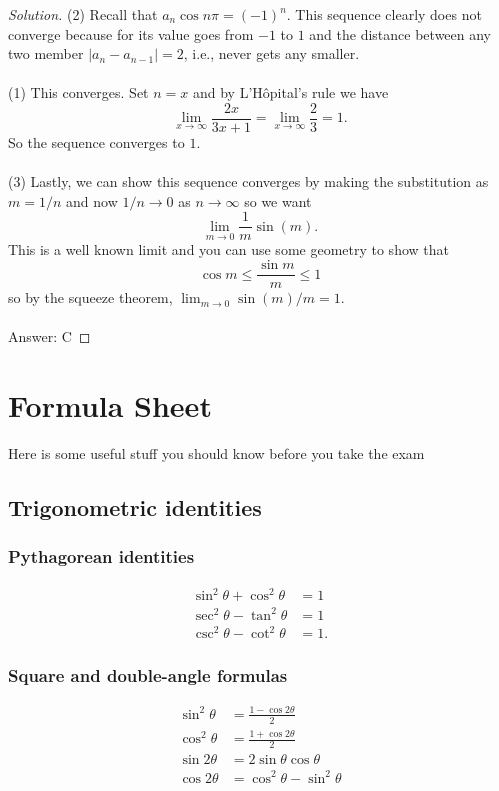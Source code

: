 \begin{proof}[Solution]
(2) Recall that $a_n\cos n\pi=(-1)^n$. This sequence clearly does not converge
because for its value goes from $-1$ to $1$ and the distance between any
two member $|a_n-a_{n-1}|=2$, i.e., never gets any smaller.
\\\\
(1) This converges. Set $n=x$ and by L'Hôpital's rule we have
\[
\lim_{x\to\infty} \frac{2x}{3x+1}=\lim_{x\to\infty}\frac{2}{3}=1.
\]
So the sequence converges to $1$.
\\\\
(3) Lastly, we can show this sequence converges by making the substitution
as $m=1/n$ and now $1/n\to 0$ as $n\to\infty$ so we want
\[
\lim_{m\to 0}\frac{1}{m}\sin(m).
\]
This is a well known limit and you can use some geometry to show that
\[
\cos m\leq \frac{\sin m}{m}\leq 1
\]
so by the squeeze theorem, $\lim_{m\to 0}\sin(m)/m=1$.
\\\\
Answer: C
\end{proof}

\chapter{Formula Sheet}
Here is some useful stuff you should know before you take the exam
\section{Trigonometric identities}
\subsection{Pythagorean identities}
\begin{align}
\label{eq:trig-identities}
\sin^2\theta+\cos^2\theta&=1\\
\sec^2\theta-\tan^2\theta&=1\\
\csc^2\theta-\cot^2\theta&=1.
\end{align}
\subsection{Square and double-angle formulas}
\begin{align}
\label{eq:dobule-angle}
\sin^2\theta&=\frac{1-\cos 2\theta}{2}\\
\cos^2\theta&=\frac{1+\cos 2\theta}{2}\\
\sin 2\theta&=2\sin\theta\cos\theta\\
\cos 2\theta&=\cos^2\theta-\sin^2\theta
\end{align}

